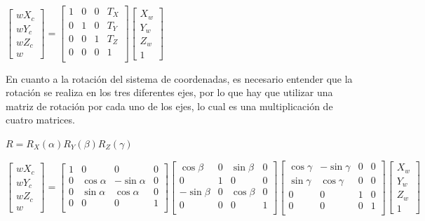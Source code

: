 \begin{center}
$
\begin{bmatrix} wX_c \\ wY_c \\ wZ_c \\ w \end{bmatrix}
=
\begin{bmatrix}
1 & 0 & 0 & T_X \\
0 & 1 & 0 & T_Y \\
0 & 0 & 1 & T_Z \\
0 & 0 & 0 & 1 \\
\end{bmatrix}
\begin{bmatrix} X_w \\ Y_w \\ Z_w \\ 1 \end{bmatrix}
$
\end{center}

En cuanto a la rotación del sistema de coordenadas, es necesario entender que la rotación se realiza en los tres diferentes ejes, por lo que hay que utilizar una matriz de rotación por cada uno de los ejes, lo cual es una multiplicación de cuatro matrices.

\begin{center}
$R = R_X(\alpha) R_Y(\beta) R_Z(\gamma)$
\end{center}

\begin{center}
$
\begin{bmatrix} wX_c \\ wY_c \\ wZ_c \\ w \end{bmatrix}
=
\begin{bmatrix}
1 & 0 & 0 & 0 \\
0 & \cos \alpha & -\sin \alpha & 0 \\
0 & \sin \alpha & \cos \alpha & 0 \\
0 & 0 & 0 & 1 \\
\end{bmatrix}
\begin{bmatrix}
\cos \beta & 0 & \sin \beta & 0 \\
0 & 1 & 0 & 0 \\
- \sin \beta & 0 & \cos \beta & 0 \\
0 & 0 & 0 & 1 \\
\end{bmatrix}
\begin{bmatrix}
\cos \gamma & - \sin \gamma & 0 & 0 \\
\sin \gamma & \cos \gamma & 0 & 0 \\
0 & 0 & 1 & 0 \\
0 & 0 & 0 & 1 \\
\end{bmatrix}
\begin{bmatrix} X_w \\ Y_w \\ Z_w \\ 1 \end{bmatrix}
$
\end{center}

